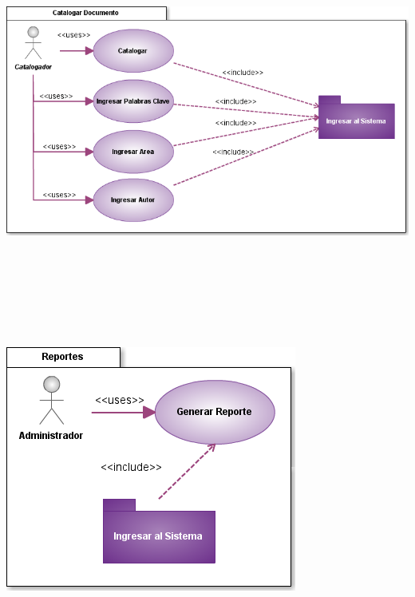 \documentclass[]{article}
\begin{document}
	\begin{minipage}[c]{1\linewidth}
		\centering
		\includegraphics[width=16cm, height=14cm]{casosUso/CUCatalogar}
	\end{minipage}
		\newpage
	
	\begin{minipage}[c]{1\linewidth}
		\centering
		\includegraphics[scale=.7]{casosUso/CUReportes}
	\end{minipage} \\\\ \\\\
	
\end{document}
